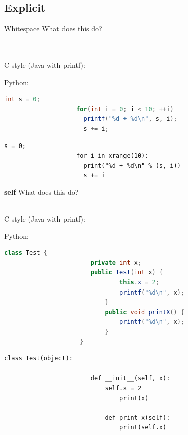 \documentclass[11pt]{beamer}
\newcommand{\emptyline}{$ $\\}
\begin{document}
	\subsection{Explicit}
		\begin{frame}[fragile]{Whitespace}
			What does this do?
			\emptyline
			\emptyline
			\emptyline

			\begin{minipage}{0.45\linewidth}
    				C-style (Java with printf):
			\end{minipage}	
			\begin{minipage}{0.45\linewidth}
    				Python:	
			\end{minipage}	
			
			\begin{minipage}{0.45\linewidth}
				\begin{lstlisting}[language=Java, basicstyle=\small]
					int s = 0;
					for(int i = 0; i < 10; ++i)
					  printf("%d + %d\n", s, i);
					  s += i;
				\end{lstlisting}
			\end{minipage}			
			\pause 
			\begin{minipage}{0.45\linewidth}
				\begin{lstlisting}[basicstyle=\small]
					s = 0;
					for i in xrange(10):
					  print("%d + %d\n" % (s, i))
					  s += i
				\end{lstlisting}
			\end{minipage}
		\end{frame}
		
		\begin{frame}[fragile]{\textbf{self}}
			What does this do?
			\emptyline
			\emptyline
			
			\begin{minipage}{0.45\linewidth}
    				C-style (Java with printf):
			\end{minipage}	
			\begin{minipage}{0.45\linewidth}
    				Python:	
			\end{minipage}				

			\begin{minipage}{0.45\linewidth}
				\begin{lstlisting}[language=Java, basicstyle=\small]
					class Test {
					    private int x;
					    public Test(int x) {
					    	    this.x = 2;
					    	    printf("%d\n", x);
					    	}
					    	public void printX() {
					    	    printf("%d\n", x);
					    	}
					 }
				\end{lstlisting}
			\end{minipage}			
			\pause 
			\begin{minipage}{0.45\linewidth}
				\begin{lstlisting}[basicstyle=\small]
					class Test(object):

					    def __init__(self, x):
					        self.x = 2
					    	    print(x)
					    	
					    	def print_x(self):
					    	    print(self.x)
				\end{lstlisting}
			\end{minipage}
		\end{frame}
		
\end{document}
